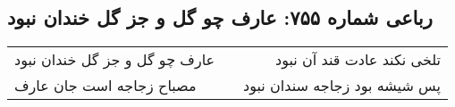 \begin{center}
\section*{رباعی شماره ۷۵۵: عارف چو گل و جز گل خندان نبود}
\label{sec:0755}
\begin{longtable}{l p{0.5cm} r}
عارف چو گل و جز گل خندان نبود
&&
تلخی نکند عادت قند آن نبود
\\
مصباح زجاجه است جان عارف
&&
پس شیشه بود زجاجه سندان نبود
\\
\end{longtable}
\end{center}
